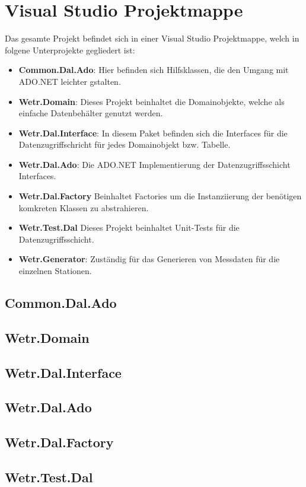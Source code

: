 \section{Visual Studio Projektmappe}

Das gesamte Projekt befindet sich in einer Visual Studio Projektmappe, welch in folgene Unterprojekte gegliedert ist:
\begin{itemize}
    \item \textbf{Common.Dal.Ado}: Hier befinden sich Hilfsklassen, die den Umgang mit ADO.NET leichter gstalten.
    \item \textbf{Wetr.Domain}: Dieses Projekt beinhaltet die Domainobjekte, welche als einfache Datenbehälter genutzt werden.
    \item \textbf{Wetr.Dal.Interface}: In diesem Paket befinden sich die Interfaces für die Datenzugriffschricht für jedes Domainobjekt bzw. Tabelle.
    \item \textbf{Wetr.Dal.Ado}: Die ADO.NET Implementierung der Datenzugriffsschicht Interfaces.
    \item \textbf{Wetr.Dal.Factory} Beinhaltet Factories um die Instanziierung der benötigen komkreten Klassen zu abstrahieren.
    \item \textbf{Wetr.Test.Dal} Dieses Projekt beinhaltet Unit-Tests für die Datenzugriffsschicht.
    \item \textbf{Wetr.Generator}: Zuständig für das Generieren von Messdaten für die einzelnen Stationen.
\end{itemize}

\subsection{Common.Dal.Ado}
\subsection{Wetr.Domain}
\subsection{Wetr.Dal.Interface}
\subsection{Wetr.Dal.Ado}
\subsection{Wetr.Dal.Factory}
\subsection{Wetr.Test.Dal}

